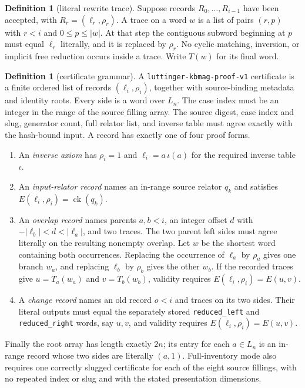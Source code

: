 \documentclass[11pt]{article}
\theoremstyle{definition}
\newtheorem{definition}[theorem]{Definition}
\begin{document}
\begin{definition}[literal rewrite trace]\label{def:trace}
Suppose records $R_0,\ldots,R_{i-1}$ have been accepted, with
$R_r=(\ell_r,\rho_r)$.  A trace on a word $w$ is a list of pairs $(r,p)$
with $r<i$ and $0\leq p\leq |w|$.  At that step the contiguous subword beginning at
$p$ must equal $\ell_r$ literally, and it is replaced by $\rho_r$.
No cyclic matching, inversion, or implicit free reduction occurs inside a
trace.  Write $T(w)$ for its final word.
\end{definition}

\begin{definition}[certificate grammar]\label{def:grammar}
A \texttt{luttinger-kbmag-proof-v1} certificate is a finite ordered list of
records $(\ell_i,\rho_i)$, together with source-binding metadata and identity
roots.  Every side is a word over $L_n$.  The case index must be an integer
in the range of the source filling array.  The source digest, case index and
slug, generator count, full relator list, and inverse table must agree
exactly with the hash-bound input.  A record has exactly one of four proof
forms.

\begin{enumerate}[label=\textup{(\roman*)},leftmargin=2.3em]
\item An \emph{inverse axiom} has $\rho_i=1$ and
  $\ell_i=a\,\iota(a)$ for the required inverse table $\iota$.

\item An \emph{input-relator record} names an in-range source relator $q_k$
  and satisfies $E(\ell_i,\rho_i)=\operatorname{ck}(q_k)$.

\item An \emph{overlap record} names parents $a,b<i$, an integer offset
  $d$ with $-|\ell_b|<d<|\ell_a|$, and two traces.  The two parent left
  sides must agree literally on the resulting nonempty overlap.  Let $w$ be
  the shortest word containing both occurrences.  Replacing the occurrence
  of $\ell_a$ by $\rho_a$ gives one branch $w_a$, and replacing
  $\ell_b$ by $\rho_b$ gives the other $w_b$.  If the recorded traces give
  $u=T_a(w_a)$ and $v=T_b(w_b)$, validity requires
  $E(\ell_i,\rho_i)=E(u,v)$.

\item A \emph{change record} names an old record $o<i$ and traces on its two
  sides.  Their literal outputs must equal the separately stored
  \texttt{reduced\_left} and \texttt{reduced\_right} words, say $u,v$, and
  validity requires $E(\ell_i,\rho_i)=E(u,v)$.
\end{enumerate}

Finally the root array has length exactly $2n$; its entry for each
$a\in L_n$ is an in-range record whose two sides are literally $(a,1)$.
Full-inventory mode also requires one correctly slugged certificate for each
of the eight source fillings, with no repeated index or slug and with the
stated presentation dimensions.
\end{definition}
\end{document}
